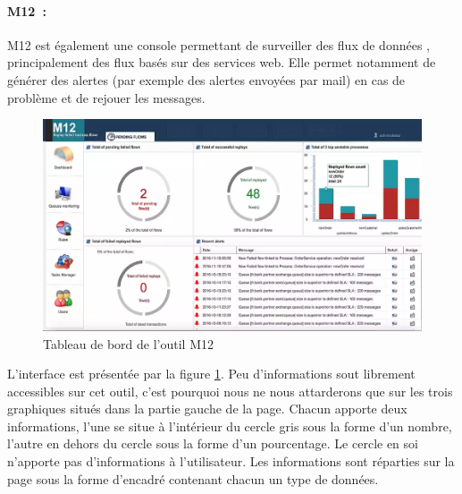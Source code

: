 			\paragraph{M12~:}
			M12 est également une console permettant de surveiller des flux de données
			\citep{processmview_m12}, principalement des flux basés sur des services web.
			Elle permet notamment de générer des alertes (par exemple des alertes envoyées par mail) en cas de
			problème et de rejouer les messages.\newline
			\begin{figure}[H]
				\centering
				\includegraphics[width=16cm]{../img/part2/m12.png}
				\caption{\label{m12} Tableau de bord de l'outil M12}
			\end{figure}
			
			L'interface est présentée par la figure \ref{m12}. Peu d'informations sout
			librement accessibles sur cet outil, c'est pourquoi nous ne nous attarderons
			que sur les trois graphiques situés dans la partie gauche de la page.
			Chacun apporte deux informations, l'une se situe à l'intérieur du cercle
			gris sous la forme d'un nombre, l'autre en dehors du cercle sous la forme
			d'un pourcentage. Le cercle en soi n'apporte pas d'informations à
			l'utilisateur.\newline
			Les informations sont réparties sur la page sous la
			forme d'encadré contenant chacun un type de données.
			
